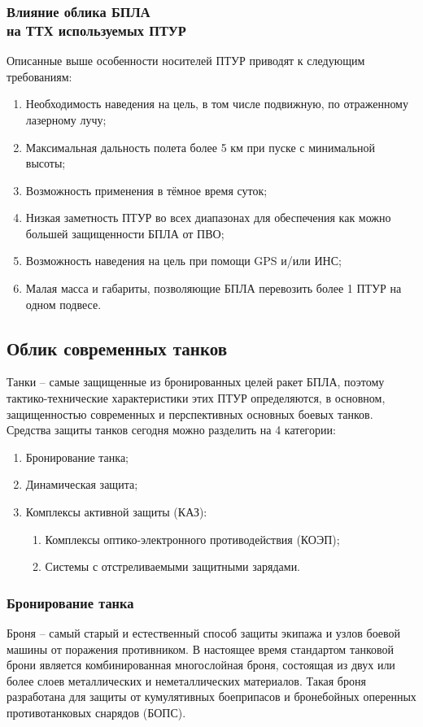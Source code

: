 \clearpage
\subsubsection{Влияние облика БПЛА \\на ТТХ используемых ПТУР}
Описанные выше особенности носителей ПТУР приводят к следующим требованиям:
\begin{enumerate}[1.]
	\item Необходимость наведения на цель, в том числе подвижную, по отраженному лазерному лучу;
	\item Максимальная дальность полета более 5 км при пуске с минимальной высоты;
	\item Возможность применения в тёмное время суток;
	\item Низкая заметность ПТУР во всех диапазонах для обеспечения как можно большей защищенности БПЛА от ПВО;
	\item Возможность наведения на цель при помощи GPS и/или ИНС;
	\item Малая масса и габариты, позволяющие БПЛА перевозить более 1 ПТУР на одном подвесе.
\end{enumerate}

\clearpage
\subsection{Облик современных танков}
Танки – самые защищенные из бронированных целей ракет БПЛА, поэтому тактико-технические характеристики этих ПТУР определяются, в основном, защищенностью современных и перспективных основных боевых танков.
Средства защиты танков сегодня можно разделить на 4 категории:
\begin{enumerate}[1.]
	\item Бронирование танка;
	\item Динамическая защита;
	\item Комплексы активной защиты (КАЗ):
	\begin{enumerate} [3.1.]
		\item Комплексы оптико-электронного противодействия (КОЭП);
		\item Системы с отстреливаемыми защитными зарядами.
	\end{enumerate}
\end{enumerate}

\subsubsection{Бронирование танка}
Броня – самый старый и естественный способ защиты экипажа и узлов боевой машины от поражения противником. В настоящее время стандартом танковой брони является комбинированная многослойная броня, состоящая из двух или более слоев металлических и неметаллических материалов. Такая броня разработана для защиты от кумулятивных боеприпасов и бронебойных оперенных противотанковых снарядов (БОПС).

